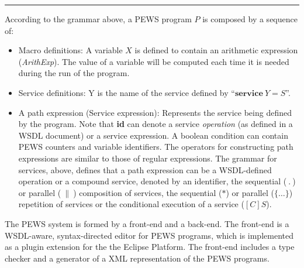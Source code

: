 \documentclass{sig-alternate}
\begin{document}
\hrule

\vspace*{2mm}


\noindent According to the grammar above, a PEWS program $P$ is composed by a sequence of:
\begin{itemize}
\item Macro definitions: A variable $X$ is defined to
contain an arithmetic expression (\textit{ArithExp}). 
The value of a variable will be computed each time it is needed during the run of the program. 

\item Service definitions: Y is the name of the service defined by ``$\mathbf{service}\ Y = S$\/''.
 
\item A path expression (Service expression): Represents the service being 
defined by the program. 
Note that \textbf{id} can denote a service \textit{operation} (as defined in a WSDL document) or a service expression. 
A boolean condition can 
contain PEWS counters and variable identifiers.
The operators for constructing path expressions are similar to those of regular
expressions. 
The grammar for services, above, defines that a path expression can be a
WSDL-defined operation or a compound service, denoted by an identifier, the sequential ($\ . \ $) or parallel ($\ \| \ $) composition of services, the sequential ($*$)
or parallel ($\{\dots\}$) repetition of services or the conditional execution of a service ($[C]S$).
\end{itemize} 



The PEWS system \cite{MPC08} is formed by a front-end and a back-end.
The front-end is a WSDL-aware, syntax-directed editor for PEWS programs,
which is implemented as a plugin extension for the the Eclipse Platform.
The front-end includes a type checker and a generator of a XML representation of the PEWS programs. 
\end{document}
